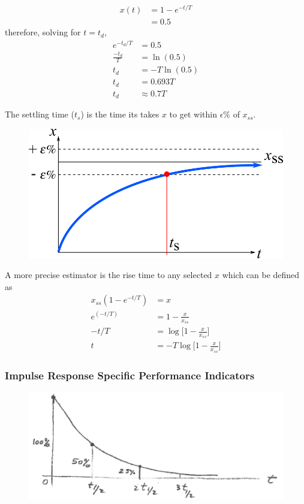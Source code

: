 \documentclass[12pt,letter]{article}
\numberwithin{ex}{section} %
\numberwithin{re}{section} %
\numberwithin{equation}{section}	%
\begin{document}
\begin{align}
x(t) &= 1-e^{-t/T} \\
&= 0.5 \nonumber
\end{align}
therefore, solving for $t=t_d$,
\begin{align}
e^{-t_d/T} &= 0.5 \\
\frac{-t_d}{T} &= \ln(0.5) \nonumber \\
t_d &= -T \ln(0.5) \nonumber \\
t_d &= 0.693 T \nonumber \\
t_d & \approx 0.7T \nonumber 
\end{align}

The settling time ($t_s$) is the time its takes $x$ to get within $\epsilon \%$ of $x_{ss}$.
\begin{figure}[H]
	\centering
	\includegraphics[]{../figures/performance_indicator_settling_time}
\end{figure}

A more precise estimator is the rise time to any selected $x$ which can be defined as
\begin{align}
x_{ss}(1-e^{-t/T})&=x \\
 e^{(-t/T)} &= 1-\frac{x}{x_{ss}} \nonumber \\ 
-t/T &= \log \bigg[ 1-\frac{x}{x_{ss}} \bigg]  \nonumber \\ 
t &= -T \log \bigg[ 1-\frac{x}{x_{ss}} \bigg] \nonumber 
\end{align}

\subsubsection{Impulse Response Specific Performance Indicators}

\begin{figure}[H]
	\centering
	\includegraphics[width=4.5in]{../figures/system_specific_performance_indicator_decay_time}
\end{figure}
\end{document}
